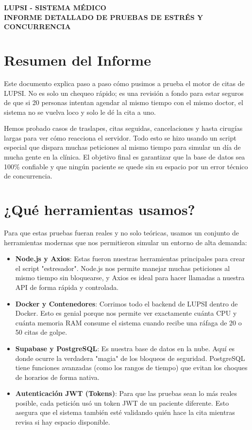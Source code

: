\documentclass[a4paper,11pt]{article}
\begin{document}
  \raggedbottom

  \begin{center}
      {\LARGE \textbf{LUPSI - SISTEMA MÉDICO}} \\[0.4cm]
      {\large \textbf{INFORME DETALLADO DE PRUEBAS DE ESTRÉS Y CONCURRENCIA}} \\[1cm]
  \end{center}

  \section{Resumen del Informe}
  Este documento explica paso a paso cómo pusimos a prueba el motor de citas de LUPSI. No es solo un chequeo rápido; es una revisión a fondo para estar seguros de que si 20 personas intentan agendar al mismo tiempo con el mismo doctor, el sistema no se vuelva loco y solo le dé la cita a uno. 

  Hemos probado casos de traslapes, citas seguidas, cancelaciones y hasta cirugías largas para ver cómo reacciona el servidor. Todo esto se hizo usando un script especial que dispara muchas peticiones al mismo tiempo para simular un día de mucha gente en la clínica. El objetivo final es garantizar que la base de datos sea 100\% confiable y que ningún paciente se quede sin su espacio por un error técnico de concurrencia.

  \section{¿Qué herramientas usamos?}
  Para que estas pruebas fueran reales y no solo teóricas, usamos un conjunto de herramientas modernas que nos permitieron simular un entorno de alta demanda:

  \begin{itemize}
      \item \textbf{Node.js y Axios}: Estas fueron nuestras herramientas principales para crear el script "estresador". Node.js nos permite manejar muchas peticiones al mismo tiempo sin bloquearse, y Axios es ideal para hacer llamadas a nuestra API de forma rápida y controlada.
      \item \textbf{Docker y Contenedores}: Corrimos todo el backend de LUPSI dentro de Docker. Esto es genial porque nos permite ver exactamente cuánta CPU y cuánta memoria RAM consume el sistema cuando recibe una ráfaga de 20 o 50 citas de golpe.
      \item \textbf{Supabase y PostgreSQL}: Es nuestra base de datos en la nube. Aquí es donde ocurre la verdadera "magia" de los bloqueos de seguridad. PostgreSQL tiene funciones avanzadas (como los rangos de tiempo) que evitan los choques de horarios de forma nativa.
      \item \textbf{Autenticación JWT (Tokens)}: Para que las pruebas sean lo más reales posible, cada petición usó un token JWT de un paciente diferente. Esto asegura que el sistema también esté validando quién hace la cita mientras revisa si hay espacio disponible.
  \end{itemize}
\end{document}
